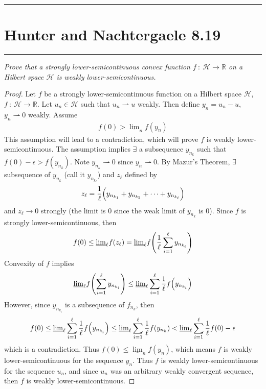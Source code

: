\documentclass{article} %
\theoremstyle{plain}
\def\Rl{\mathbb{R}}
\newcommand{\Hilb}{\mathcal{H}}
\newcommand{\problem}[1]{
\vspace{.375cm}
\begin{minipage}{\textwidth}
    \begin{center}
        \noindent\rule{5cm}{1pt}
    \end{center}
    \section{\bf #1}
    \begin{center}
        \noindent\rule{5cm}{1pt}
    \end{center}
    \vspace{0.25cm}
\end{minipage}
}
\numberwithin{equation}{section} %
\numberwithin{figure}{section} %
\numberwithin{table}{section} %
\begin{document}
\problem{Hunter and Nachtergaele 8.19}
\emph{Prove that a strongly lower-semicontinuous convex function $f\ :\ \Hilb \rightarrow \Rl$ on a Hilbert space $\Hilb$ is weakly lower-semicontinuous.}

\begin{proof}
    Let $f$ be a strongly lower-semicontinuous function on a Hilbert space $\Hilb$, $f\ :\ \Hilb\rightarrow\mathbb{R}$.  Let $u_n \in \Hilb$ such that $u_n \rightharpoonup u$ weakly.  Then define $y_n = u_n - u$, $y_n \rightharpoonup 0$ weakly.  Assume
    \begin{align*}
        f(0) > \underline{\lim}_n f(y_n)
    \end{align*}
    This assumption will lead to a contradiction, which will prove $f$ is weakly lower-semicontinuous.  The assumption implies $\exists$ a subsequence $y_{n_k}$ such that $f(0) - \epsilon > f(y_{n_k})$.  Note $y_{n_k} \rightharpoonup 0$ since $y_n \rightharpoonup 0$.  By Mazur's Theorem, $\exists$ subsequence of $y_{n_k}$ (call it $y_{n_{k_\ell}}$) and $z_\ell$ defined by
    \begin{align*}
        z_\ell = \frac{1}{\ell}\qty(y_{n_{k_1}} + y_{n_{k_2}} + \dots + y_{n_{k_\ell}})
    \end{align*}
    and $z_\ell \rightarrow 0$ strongly (the limit is $0$ since the weak limit of $y_{n_k}$ is $0$).  Since $f$ is strongly lower-semicontinuous, then
    \begin{align*}
        f(0) \leq \underline{\lim}_\ell f\qty(z_\ell) = \underline{\lim}_\ell f\qty(\frac{1}{\ell}\sum_{i=1}^\ell y_{n_{k_i}})
    \end{align*}
    Convexity of $f$ implies
    \begin{align*}
        \underline{\lim}_\ell f\qty(\sum_{i=1}^\ell y_{n_{k_i}}) \leq \underline{\lim}_\ell \sum_{i=1}^\ell \frac{1}{\ell}f\qty(y_{n_{k_i}})
    \end{align*}
    However, since $y_{n_{k_i}}$ is a subsequence of $f_{n_k}$, then
    \begin{align*}
        f(0) \leq \underline{\lim}_\ell \sum_{i=1}^\ell \frac{1}{\ell}f\qty(y_{n_{k_i}}) \leq \underline{\lim}_\ell \sum_{i=1}^\ell \frac{1}{\ell}f\qty(y_{n_k}) < \underline{\lim}_\ell \sum_{i=1}^\ell \frac{1}{\ell} f(0) - \epsilon
    \end{align*}
    which is a contradiction.  Thus $f(0) \leq \underline{\lim}_n f(y_n)$, which means $f$ is weakly lower-semicontinuous for the sequence $y_n$.  Thus $f$ is weakly lower-semicontinuous for the sequence $u_n$, and since $u_n$ was an arbitrary weakly convergent sequence, then $f$ is weakly lower-semicontinuous.
\end{proof}
\end{document}
